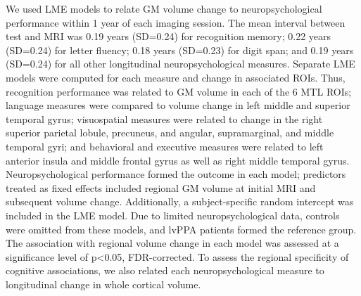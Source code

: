 \documentclass[]{article}
\begin{document}
We used LME models to relate GM volume change to neuropsychological
performance within 1 year of each imaging session. The mean interval
between test and MRI was 0.19 years (SD=0.24) for recognition memory;
0.22 years (SD=0.24) for letter fluency; 0.18 years (SD=0.23) for digit
span; and 0.19 years (SD=0.24) for all other longitudinal
neuropsychological measures. Separate LME models were computed for each
measure and change in associated ROIs. Thus, recognition performance was
related to GM volume in each of the 6 MTL ROIs; language measures were
compared to volume change in left middle and superior temporal gyrus;
visuospatial measures were related to change in the right superior
parietal lobule, precuneus, and angular, supramarginal, and middle
temporal gyri; and behavioral and executive measures were related to
left anterior insula and middle frontal gyrus as well as right middle
temporal gyrus. Neuropsychological performance formed the outcome in
each model; predictors treated as fixed effects included regional GM
volume at initial MRI and subsequent volume change. Additionally, a
subject-specific random intercept was included in the LME model. Due to
limited neuropsychological data, controls were omitted from these
models, and lvPPA patients formed the reference group. The association
with regional volume change in each model was assessed at a significance
level of p\textless{}0.05, FDR-corrected. To assess the regional
specificity of cognitive associations, we also related each
neuropsychological measure to longitudinal change in whole cortical
volume.
\end{document}
